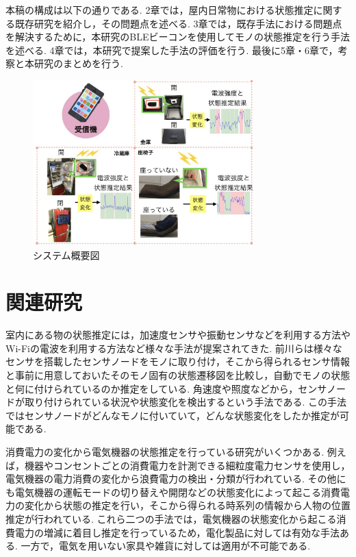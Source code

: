 \documentclass[Japanese]{dicomopapers}
\begin{document}
本稿の構成は以下の通りである.
2章では，屋内日常物における状態推定に関する既存研究を紹介し，その問題点を述べる.
3章では，既存手法における問題点を解決するために，本研究のBLEビーコンを使用してモノの状態推定を行う手法を述べる.
4章では，本研究で提案した手法の評価を行う.
最後に5章・6章で，考察と本研究のまとめを行う.



\begin{figure}[tbh]
 \centering
 \includegraphics[width=8.5cm]{abst.jpeg}
 \caption{システム概要図}
 \label{abst}
\end{figure}

\section{関連研究}
室内にある物の状態推定には，加速度センサや振動センサなどを利用する方法やWi-Fiの電波を利用する方法など様々な手法が提案されてきた.
前川ら\cite{TagAndThink}は様々なセンサを搭載したセンサノードをモノに取り付け，そこから得られるセンサ情報と事前に用意しておいたそのモノ固有の状態遷移図を比較し，自動でモノの状態と何に付けられているのか推定をしている.
角速度や照度などから，センサノードが取り付けられている状況や状態変化を検出するという手法である.
この手法ではセンサノードがどんなモノに付いていて，どんな状態変化をしたか推定が可能である.


消費電力の変化から電気機器の状態推定を行っている研究がいくつかある.
例えば，機器やコンセントごとの消費電力を計測できる細粒度電力センサを使用し，電気機器の電力消費の変化から浪費電力の検出・分類が行われている\cite{sairyu}.
その他にも電気機器の運転モードの切り替えや開閉などの状態変化によって起こる消費電力の変化から状態の推定を行い，そこから得られる時系列の情報から人物の位置推定が行われている\cite{energy}.
これら二つの手法では，電気機器の状態変化から起こる消費電力の増減に着目し推定を行っているため，電化製品に対しては有効な手法ある.
一方で，電気を用いない家具や雑貨に対しては適用が不可能である.
\end{document}

